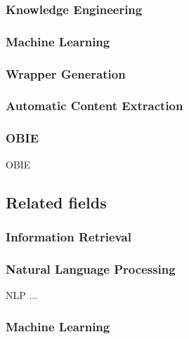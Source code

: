\subsubsection{Knowledge Engineering}

\subsubsection{Machine Learning}

\subsubsection{Wrapper Generation}

\subsubsection{Automatic Content Extraction}

\subsubsection{\acrlong{OBIE}}
\gls{OBIE}

\newpage
\subsection{Related fields}

\subsubsection{Information Retrieval}

\subsubsection{Natural Language Processing}
\gls{NLP} ...

\subsubsection{Machine Learning}
